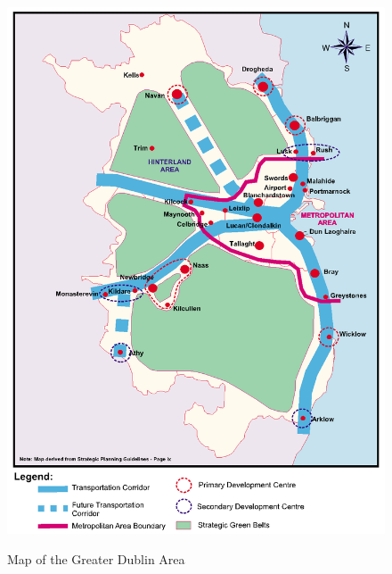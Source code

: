 \begin{figure}[htbp]
\center \includegraphics[width=400pt]{intro1}\\
\caption{Map of the Greater Dublin Area \citep{PLA01}} \label{Figure: Map of the Greater Dublin
Area}
\end{figure}

\newpage

